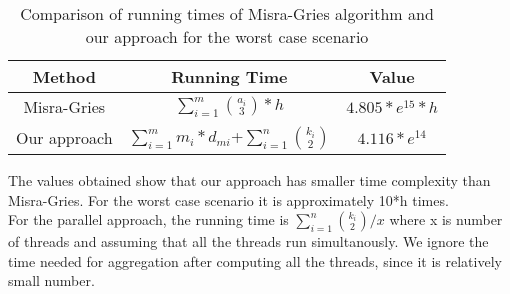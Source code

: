 \begin{table}[ht]
\caption{Comparison of running times of Misra-Gries algorithm and our approach for the worst case scenario}
\centering
\begin{tabular}{c c c}
\hline\hline
Method & Running Time & Value \\ [0.5ex]
\hline
Misra-Gries&\(\sum\limits_{i=1}^m{a_i \choose 3}*h\)&\(4.805*e^{15} * h\)\\
Our approach&\(\sum\limits_{i=1}^m{m_i * d_{mi}}\)+\(\sum\limits_{i=1}^n{k_i \choose 2}\)&\(4.116*e^{14}\)\\
\hline
\end{tabular}
\label{comparison}
\end{table}
The values obtained show that our approach has smaller time complexity than Misra-Gries. For the worst case scenario it is approximately 10*h times.
\\
For the parallel approach, the running time is \(\sum\limits_{i=1}^n{k_i \choose 2}/x\) where x is number of threads and assuming that all the threads run simultanously. We ignore the time needed for aggregation after computing all the threads, since it is relatively small number.

